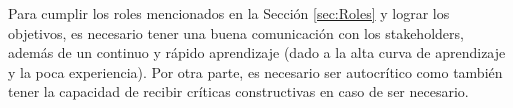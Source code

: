 Para cumplir los roles mencionados en la Sección \ref{sec:Roles} y lograr los objetivos, es necesario tener una buena comunicación con los stakeholders, además de un continuo y rápido aprendizaje (dado a la alta curva de aprendizaje y la poca experiencia). Por otra parte, es necesario ser autocrítico como también tener la capacidad de recibir críticas constructivas en caso de ser necesario.